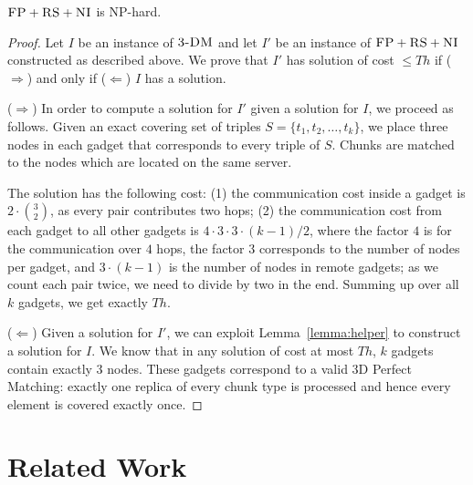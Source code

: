 \documentclass[conference,10pt]{IEEEtran}
\newcommand{\CC}{\textsc{NI}}
\newcommand{\FP}{\textsc{FP}}
\newcommand{\RS}{\textsc{RS}}
\newcommand{\TDM}{\textsc{3-DM}}
\newcommand{\Thr}{\ensuremath{Th}}
\begin{document}
\begin{theorem}
\label{theorem:fp_rs_cc}
$\FP+\RS+\CC$ is NP-hard.
\end{theorem}
\begin{proof}
Let $I$ be an instance of $\TDM$ and let $I'$ be an instance of
$\FP+\RS+\CC$ constructed as described above.
We prove that $I'$ has solution of cost $\leq \Thr$ if ($\Rightarrow$) and only if
($\Leftarrow$)
$I$ has a solution.

($\Rightarrow$) In order to compute a solution
for $I'$ given a solution for $I$, we proceed as follows.
Given an exact covering set of triples $S = \{t_1, t_2,
\ldots, t_k\}$, we place three nodes in each gadget that
corresponds to every triple of $S$. Chunks are matched to the nodes which are located
on the same server.

The solution has the following cost:
(1) the communication cost inside a gadget is $2 \cdot {3 \choose 2}$,
  as every pair contributes two hops;
  (2) the communication cost from each gadget to all other gadgets is $4
  \cdot 3 \cdot 3 \cdot (k - 1) / 2$, where the factor $4$ is
  for the
  communication over $4$ hops, the factor $3$
  corresponds to the number of nodes per gadget, and
  $3 \cdot (k-1)$ is the number of nodes in remote gadgets;
  as we count each pair twice, we need to divide by two in the end.
Summing up over all $k$ gadgets, we get exactly $\Thr$.

($\Leftarrow$) Given a solution for $I'$,
we can exploit Lemma~\ref{lemma:helper} to construct a solution for $I$.
We know that in any solution of cost at most $\Thr$,
$k$ gadgets contain exactly 3 nodes. These gadgets correspond to a valid
3D Perfect Matching: exactly one replica of every chunk type is processed and
hence every element is covered exactly once.
\end{proof}



\section{Related Work}\label{sec:relwork}
\end{document}
